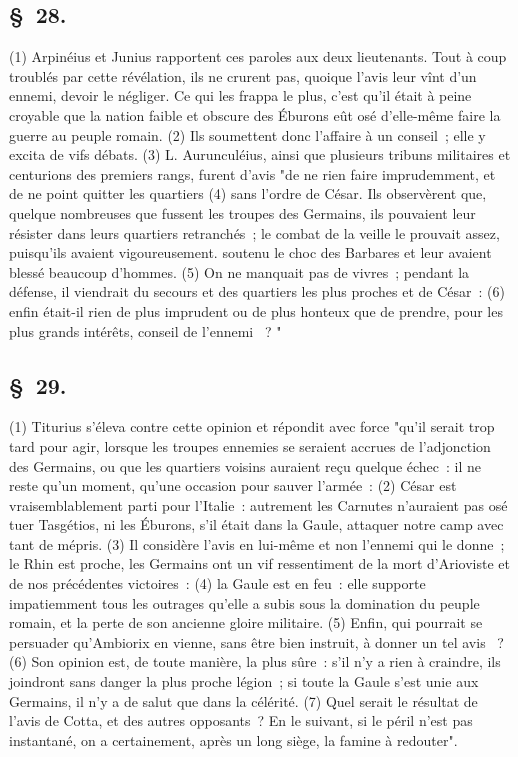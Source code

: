 \documentclass[french,twoside]{book} %
\begin{document}
\subsection[{§ 28.}]{ \textsc{§ 28.} }
\noindent (1) Arpinéius et Junius rapportent ces paroles aux deux lieutenants. Tout à coup troublés par cette révélation, ils ne crurent pas, quoique l’avis leur vînt d’un ennemi, devoir le négliger. Ce qui les frappa le plus, c’est qu’il était à peine croyable que la nation faible et obscure des Éburons eût osé d’elle-même faire la guerre au peuple romain. (2) Ils soumettent donc l’affaire à un conseil ; elle y excita de vifs débats. (3) L. Aurunculéius, ainsi que plusieurs tribuns militaires et centurions des premiers rangs, furent d’avis "de ne rien faire imprudemment, et de ne point quitter les quartiers (4) sans l’ordre de César. Ils observèrent que, quelque nombreuses que fussent les troupes des Germains, ils pouvaient leur résister dans leurs quartiers retranchés ; le combat de la veille le prouvait assez, puisqu’ils avaient vigoureusement. soutenu le choc des Barbares et leur avaient blessé beaucoup d’hommes. (5) On ne manquait pas de vivres ; pendant la défense, il viendrait du secours et des quartiers les plus proches et de César : (6) enfin était-il rien de plus imprudent ou de plus honteux que de prendre, pour les plus grands intérêts, conseil de l’ennemi  ? "
\subsection[{§ 29.}]{ \textsc{§ 29.} }
\noindent (1) Titurius s’éleva contre cette opinion et répondit avec force "qu’il serait trop tard pour agir, lorsque les troupes ennemies se seraient accrues de l’adjonction des Germains, ou que les quartiers voisins auraient reçu quelque échec : il ne reste qu’un moment, qu’une occasion pour sauver l’armée : (2) César est vraisemblablement parti pour l’Italie : autrement les Carnutes n’auraient pas osé tuer Tasgétios, ni les Éburons, s’il était dans la Gaule, attaquer notre camp avec tant de mépris. (3) Il considère l’avis en lui-même et non l’ennemi qui le donne ; le Rhin est proche, les Germains ont un vif ressentiment de la mort d’Arioviste et de nos précédentes victoires : (4) la Gaule est en feu : elle supporte impatiemment tous les outrages qu’elle a subis sous la domination du peuple romain, et la perte de son ancienne gloire militaire. (5) Enfin, qui pourrait se persuader qu’Ambiorix en vienne, sans être bien instruit, à donner un tel avis  ? (6) Son opinion est, de toute manière, la plus sûre : s’il n’y a rien à craindre, ils joindront sans danger la plus proche légion ; si toute la Gaule s’est unie aux Germains, il n’y a de salut que dans la célérité. (7) Quel serait le résultat de l’avis de Cotta, et des autres opposants ? En le suivant, si le péril n’est pas instantané, on a certainement, après un long siège, la famine à redouter".
\end{document}
